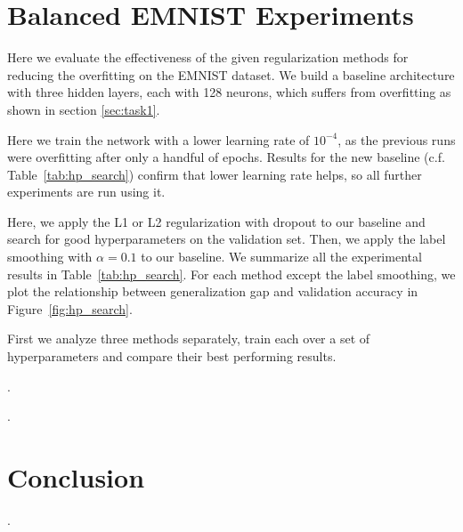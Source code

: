 \documentclass{article}
\begin{document}
\section{Balanced EMNIST Experiments}

\questionTableThree

\questionFigureFour

\label{sec:task2.2}

Here we evaluate the effectiveness of the given regularization methods for reducing the overfitting on the EMNIST dataset.
We build a baseline architecture with three hidden layers, each with 128 neurons, which suffers from overfitting as shown in section \ref{sec:task1}.

Here we train the network with a lower learning rate of $10^{-4}$, as the previous runs were overfitting after only a handful of epochs. 
Results for the new baseline (c.f. Table~\ref{tab:hp_search}) confirm that lower learning rate helps, so all further experiments are run using it.

Here, we apply the L1 or L2 regularization with dropout to our baseline and search for good hyperparameters on the validation set. 
Then, we apply the label smoothing with $\alpha=0.1$ to our baseline.
We summarize all the experimental results in Table~\ref{tab:hp_search}. For each method except the label smoothing, we plot the relationship between generalization gap and validation accuracy in Figure~\ref{fig:hp_search}.

First we analyze three methods separately, train each over a set of hyperparameters and compare their best performing results.

\questionSix.

\questionSeven.



\section{Conclusion}
\label{sec:concl}
    
\questionEight.

\newpage


\end{document}

